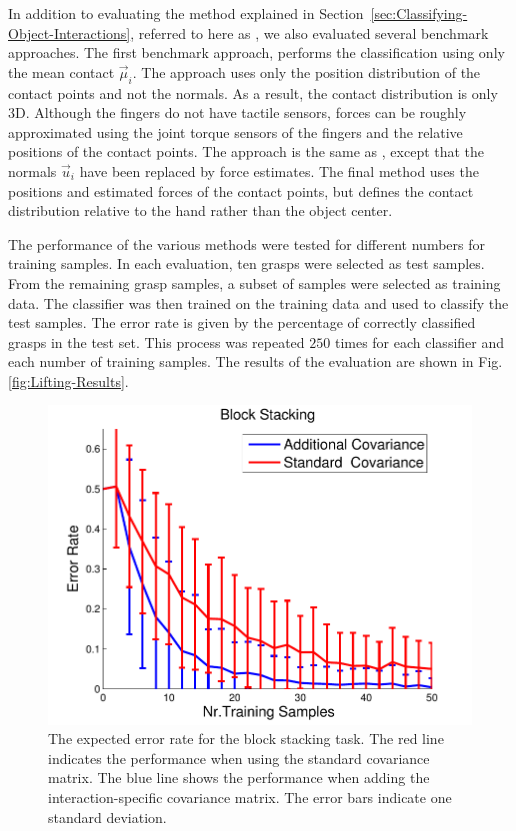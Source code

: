 In addition to evaluating the method explained in Section~\ref{sec:Classifying-Object-Interactions},
referred to here as , we also evaluated several benchmark
approaches. The first benchmark approach,  performs
the classification using only the mean contact $\vec{\mu}_{i}$. The
 approach uses only the position distribution of the contact
points and not the normals. As a result, the contact distribution
is only 3D. Although the fingers do not have tactile sensors, forces
can be roughly approximated using the joint torque sensors of the
fingers and the relative positions of the contact points. The approach is the same as , except that the normals
$\vec{u}_{i}$ have been replaced by force estimates. The final method
 uses the positions and estimated forces of the
contact points, but defines the contact distribution relative to the
hand rather than the object center. 

The performance of the various methods were tested for different numbers
for training samples. In each evaluation, ten grasps were selected
as test samples. From the remaining grasp samples, a subset of samples
were selected as training data. The classifier was then trained on
the training data and used to classify the test samples. The error
rate is given by the percentage of correctly classified grasps in
the test set. This process was repeated $250$ times for each classifier
and each number of training samples. The results of the evaluation
are shown in Fig. \ref{fig:Lifting-Results}. 

\begin{figure}
\centering{}\includegraphics[width=0.47\columnwidth]{oli/PicsforIROS2014/StackingResults2}\caption{\label{fig:stacking result}The expected error rate for the block stacking task. The red line indicates the performance when using the standard covariance matrix. The blue line shows the performance when adding the interaction-specific covariance matrix. The error bars indicate one standard deviation.}
\end{figure}

